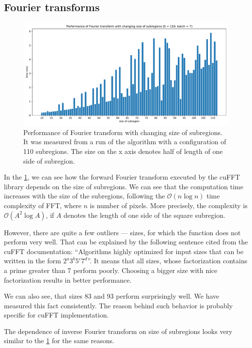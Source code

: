 \subsection{Fourier transforms}
\label{FFT-eval}
\begin{figure}
	\centering
	\includegraphics[width=\textwidth]{img/eval/Fourier-transform-size}
	\caption{Performance of Fourier transform with changing size of subregions. It was measured from a run of the algorithm with a configuration of 110 subregions. The size on the x axis denotes half of length of one side of subregion.}
	\label{Fourier-transform-size}
\end{figure}

In the \cref{Fourier-transform-size}, we can see how the forward Fourier transform executed by the cuFFT library depends on the size of subregions. We can see that the computation time increases with the size of the subregions, following the $\mathcal{O}(n \log n)$ time complexity of FFT, where $n$ is number of pixels. More precisely, the complexity is $\mathcal{O}(A^2 \log A)$, if $A$ denotes the length of one side of the square subregion.

However, there are quite a few outliers --- sizes, for which the function does not perform very well. That can be explained by the following sentence cited from the cuFFT documentation: ``Algorithms highly optimized for input sizes that can be written in the form $2^a3^b5^c7^d$''. It means that all sizes, whose factorization contains a prime greater than 7 perform poorly. Choosing a bigger size with nice factorization results in better performance.

We can also see, that sizes 83 and 93 perform surprisingly well. We have measured this fact consistently. The reason behind such behavior is probably specific for cuFFT implementation.

The dependence of inverse Fourier transform on size of subregions looks very similar to the \cref{Fourier-transform-size} for the same reasons.

